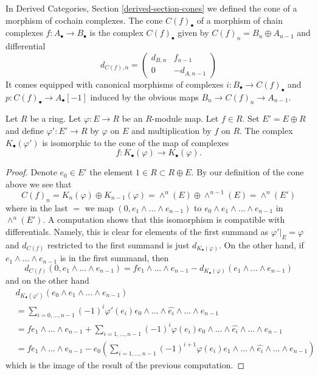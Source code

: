 \noindent
In
Derived Categories, Section \ref{derived-section-cones}
we defined the cone of a morphism of cochain complexes.
The cone $C(f)_\bullet$ of a morphism of chain complexes
$f : A_\bullet \to B_\bullet$ is the complex $C(f)_\bullet$ given by
$C(f)_n = B_n \oplus A_{n - 1}$ and differential
\begin{equation}
\label{equation-differential-cone}
d_{C(f), n} =
\left(
\begin{matrix}
d_{B, n} & f_{n - 1} \\
0 & -d_{A, n - 1}
\end{matrix}
\right)
\end{equation}
It comes equipped with canonical morphisms of complexes
$i : B_\bullet \to C(f)_\bullet$ and
$p : C(f)_\bullet \to A_\bullet[-1]$
induced by the obvious maps $B_n \to C(f)_n \to A_{n - 1}$.

\begin{lemma}
\label{lemma-cone-koszul-abstract}
Let $R$ be a ring. Let $\varphi : E \to R$ be an $R$-module map.
Let $f \in R$. Set $E' = E \oplus R$ and define $\varphi' : E' \to R$
by $\varphi$ on $E$ and multiplication by $f$ on $R$.
The complex $K_\bullet(\varphi')$ is isomorphic to the
cone of the map of complexes
$$
f :
K_\bullet(\varphi)
\longrightarrow
K_\bullet(\varphi).
$$
\end{lemma}

\begin{proof}
Denote $e_0 \in E'$ the element $1 \in R \subset R \oplus E$.
By our definition of the cone above we see that
$$
C(f)_n = K_n(\varphi) \oplus K_{n - 1}(\varphi) =
\wedge^n(E) \oplus \wedge^{n - 1}(E) = \wedge^n(E')
$$
where in the last $=$ we map $(0, e_1 \wedge \ldots \wedge e_{n - 1})$
to $e_0 \wedge e_1 \wedge \ldots \wedge e_{n - 1}$ in $\wedge^n(E')$.
A computation shows that this isomorphism is compatible with
differentials. Namely, this is clear for elements of the first
summand as $\varphi'|_E = \varphi$ and $d_{C(f)}$ restricted to
the first summand is just $d_{K_\bullet(\varphi)}$.
On the other hand, if $e_1 \wedge \ldots \wedge e_{n - 1}$
is in the first summand, then
$$
d_{C(f)}(0, e_1 \wedge \ldots \wedge e_{n - 1}) =
fe_1 \wedge \ldots \wedge e_{n - 1}
- d_{K_\bullet(\varphi)}(e_1 \wedge \ldots \wedge e_{n - 1})
$$
and on the other hand
\begin{align*}
& d_{K_\bullet(\varphi')}(e_0 \wedge e_1 \wedge \ldots \wedge e_{n - 1}) \\
& =
\sum\nolimits_{i = 0, \ldots, n - 1}
(-1)^i \varphi'(e_i)e_0 \wedge \ldots \wedge \widehat{e_i}
\wedge \ldots \wedge e_{n - 1} \\
& =
fe_1 \wedge \ldots \wedge e_{n - 1} +
\sum\nolimits_{i = 1, \ldots, n - 1}
(-1)^i \varphi(e_i)e_0 \wedge \ldots \wedge \widehat{e_i}
\wedge \ldots \wedge e_{n - 1} \\
& =
fe_1 \wedge \ldots \wedge e_{n - 1} -
e_0 \left(\sum\nolimits_{i = 1, \ldots, n - 1}
(-1)^{i + 1} \varphi(e_i)e_1 \wedge \ldots \wedge \widehat{e_i}
\wedge \ldots \wedge e_{n - 1}\right)
\end{align*}
which is the image of the result of the previous computation.
\end{proof}

